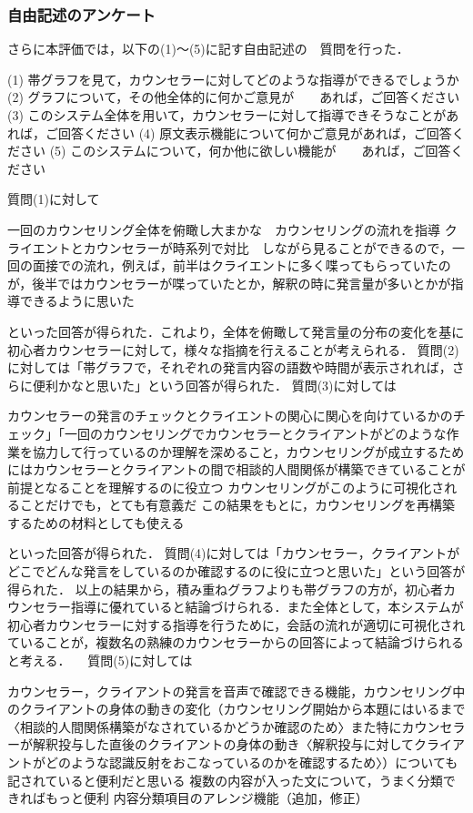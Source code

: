 \documentclass[shuuron]{kuee}
\begin{document}

\subsubsection{自由記述のアンケート}

さらに本評価では，以下の(1)～(5)に記す自由記述の　質問を行った．

(1)	帯グラフを見て，カウンセラーに対してどのような指導ができるでしょうか
(2)	グラフについて，その他全体的に何かご意見が　　あれば，ご回答ください
(3)	このシステム全体を用いて，カウンセラーに対して指導できそうなことがあれば，ご回答ください
(4)	原文表示機能について何かご意見があれば，ご回答ください
(5)	このシステムについて，何か他に欲しい機能が　　あれば，ご回答ください

質問(1)に対して

  一回のカウンセリング全体を俯瞰し大まかな　カウンセリングの流れを指導
  クライエントとカウンセラーが時系列で対比　しながら見ることができるので，一回の面接での流れ，例えば，前半はクライエントに多く喋ってもらっていたのが，後半ではカウンセラーが喋っていたとか，解釈の時に発言量が多いとかが指導できるように思いた

といった回答が得られた．これより，全体を俯瞰して発言量の分布の変化を基に初心者カウンセラーに対して，様々な指摘を行えることが考えられる．
質問(2)に対しては「帯グラフで，それぞれの発言内容の語数や時間が表示されれば，さらに便利かなと思いた」という回答が得られた．
質問(3)に対しては

  カウンセラーの発言のチェックとクライエントの関心に関心を向けているかのチェック」「一回のカウンセリングでカウンセラーとクライアントがどのような作業を協力して行っているのか理解を深めること，カウンセリングが成立するためにはカウンセラーとクライアントの間で相談的人間関係が構築できていることが前提となることを理解するのに役立つ
  カウンセリングがこのように可視化されることだけでも，とても有意義だ
  この結果をもとに，カウンセリングを再構築するための材料としても使える

といった回答が得られた．
質問(4)に対しては「カウンセラー，クライアントがどこでどんな発言をしているのか確認するのに役に立つと思いた」という回答が得られた．
以上の結果から，積み重ねグラフよりも帯グラフの方が，初心者カウンセラー指導に優れていると結論づけられる．また全体として，本システムが初心者カウンセラーに対する指導を行うために，会話の流れが適切に可視化されていることが，複数名の熟練のカウンセラーからの回答によって結論づけられると考える．
　質問(5)に対しては

  カウンセラー，クライアントの発言を音声で確認できる機能，カウンセリング中のクライアントの身体の動きの変化（カウンセリング開始から本題にはいるまで〈相談的人間関係構築がなされているかどうか確認のため〉また特にカウンセラーが解釈投与した直後のクライアントの身体の動き〈解釈投与に対してクライアントがどのような認識反射をおこなっているのかを確認するため〉）についても記されていると便利だと思いる
  複数の内容が入った文について，うまく分類できればもっと便利
  内容分類項目のアレンジ機能（追加，修正）
\end{document}
